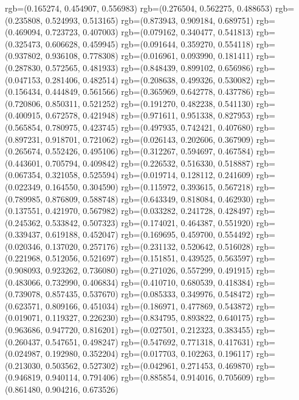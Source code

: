 {{{					rgb=(0.165274, 0.454907, 0.556983)
					rgb=(0.276504, 0.562275, 0.488653)
					rgb=(0.235808, 0.524993, 0.513165)
					rgb=(0.873943, 0.909184, 0.689751)
					rgb=(0.469094, 0.723723, 0.407003)
					rgb=(0.079162, 0.340477, 0.541813)
					rgb=(0.325473, 0.606628, 0.459945)
					rgb=(0.091644, 0.359270, 0.554118)
					rgb=(0.937802, 0.936108, 0.778308)
					rgb=(0.016961, 0.093990, 0.181411)
					rgb=(0.287830, 0.572565, 0.481933)
					rgb=(0.848439, 0.899102, 0.656986)
					rgb=(0.047153, 0.281406, 0.482514)
					rgb=(0.208638, 0.499326, 0.530082)
					rgb=(0.156434, 0.444849, 0.561566)
					rgb=(0.365969, 0.642778, 0.437786)
					rgb=(0.720806, 0.850311, 0.521252)
					rgb=(0.191270, 0.482238, 0.541130)
					rgb=(0.400915, 0.672578, 0.421948)
					rgb=(0.971611, 0.951338, 0.827953)
					rgb=(0.565854, 0.780975, 0.423745)
					rgb=(0.497935, 0.742421, 0.407680)
					rgb=(0.897231, 0.918701, 0.721062)
					rgb=(0.026143, 0.202606, 0.367909)
					rgb=(0.265674, 0.552426, 0.495106)
					rgb=(0.312267, 0.594697, 0.467584)
					rgb=(0.443601, 0.705794, 0.409842)
					rgb=(0.226532, 0.516330, 0.518887)
					rgb=(0.067354, 0.321058, 0.525594)
					rgb=(0.019714, 0.128112, 0.241609)
					rgb=(0.022349, 0.164550, 0.304590)
					rgb=(0.115972, 0.393615, 0.567218)
					rgb=(0.789985, 0.876809, 0.588748)
					rgb=(0.643349, 0.818084, 0.462930)
					rgb=(0.137551, 0.421970, 0.567982)
					rgb=(0.033282, 0.241728, 0.428497)
					rgb=(0.245362, 0.533842, 0.507323)
					rgb=(0.174021, 0.464387, 0.551920)
					rgb=(0.339437, 0.619188, 0.452047)
					rgb=(0.169695, 0.459700, 0.554492)
					rgb=(0.020346, 0.137020, 0.257176)
					rgb=(0.231132, 0.520642, 0.516028)
					rgb=(0.221968, 0.512056, 0.521697)
					rgb=(0.151851, 0.439525, 0.563597)
					rgb=(0.908093, 0.923262, 0.736080)
					rgb=(0.271026, 0.557299, 0.491915)
					rgb=(0.483066, 0.732990, 0.406834)
					rgb=(0.410710, 0.680539, 0.418384)
					rgb=(0.739078, 0.857435, 0.537670)
					rgb=(0.085333, 0.349976, 0.548472)
					rgb=(0.623571, 0.809166, 0.451034)
					rgb=(0.186971, 0.477869, 0.543872)
					rgb=(0.019071, 0.119327, 0.226230)
					rgb=(0.834795, 0.893822, 0.640175)
					rgb=(0.963686, 0.947720, 0.816201)
					rgb=(0.027501, 0.212323, 0.383455)
					rgb=(0.260437, 0.547651, 0.498247)
					rgb=(0.547692, 0.771318, 0.417631)
					rgb=(0.024987, 0.192980, 0.352204)
					rgb=(0.017703, 0.102263, 0.196117)
					rgb=(0.213030, 0.503562, 0.527302)
					rgb=(0.042961, 0.271453, 0.469870)
					rgb=(0.946819, 0.940114, 0.791406)
					rgb=(0.885854, 0.914016, 0.705609)
					rgb=(0.861480, 0.904216, 0.673526)
}}}

